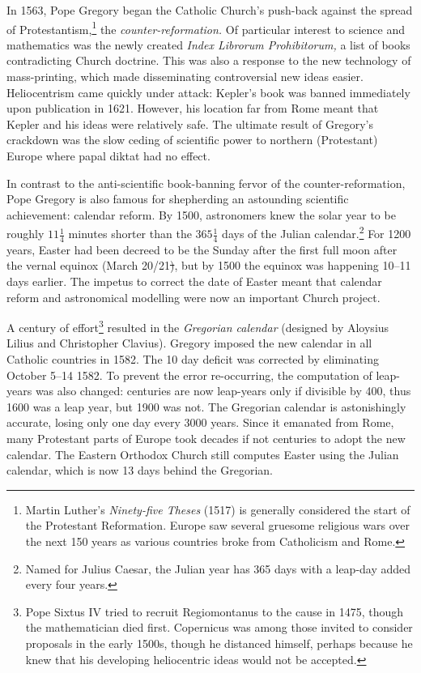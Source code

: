\goodbreak



In 1563, Pope Gregory began the Catholic Church's push-back against the spread of Protestantism,\footnote{Martin Luther's \emph{Ninety-five Theses} (1517) is generally considered the start of the Protestant Reformation. Europe saw several gruesome religious wars over the next 150 years as various countries broke from Catholicism and Rome.} the \emph{counter-reformation.} Of particular interest to science and mathematics was the newly created \emph{Index Librorum Prohibitorum,} a list of books contradicting Church doctrine. This was also a response to the new technology of mass-printing, which made disseminating controversial new ideas easier. Heliocentrism came quickly under attack: Kepler's book was banned immediately upon publication in 1621. However, his location far from Rome meant that Kepler and his ideas were relatively safe. The ultimate result of Gregory's crackdown was the slow ceding of scientific power to northern (Protestant) Europe where papal diktat had no effect. \smallbreak

In contrast to the anti-scientific book-banning fervor of the counter-reformation, Pope Gregory is also famous for shepherding an astounding scientific achievement: calendar reform. By 1500, astronomers knew the solar year to be roughly $11\frac 14$ minutes shorter than the $365\frac 14$ days of the Julian calendar.\footnote{Named for Julius Caesar, the Julian year has 365 days with a leap-day added every four years.} For 1200 years, Easter had been decreed to be the Sunday after the first full moon after the vernal equinox (March 20\th/21\st), but by 1500 the equinox was happening 10--11 days earlier. The impetus to correct the date of Easter meant that calendar reform and astronomical modelling were now an important Church project.\smallbreak

A century of effort\footnote{Pope Sixtus IV tried to recruit Regiomontanus to the cause in 1475, though the mathematician died first. Copernicus was among those invited to consider proposals in the early 1500s, though he distanced himself, perhaps because he knew that his developing heliocentric ideas would not be accepted.} resulted in the \emph{Gregorian calendar} (designed by Aloysius Lilius and Christopher Clavius). Gregory imposed the new calendar in all Catholic countries in 1582. The 10 day deficit was corrected by eliminating October 5\th--14\th{} 1582. To prevent the error re-occurring, the computation of leap-years was also changed: centuries are now leap-years only if divisible by 400, thus 1600 was a leap year, but 1900 was not. The Gregorian calendar is astonishingly accurate, losing only one day every 3000 years. Since it emanated from Rome, many Protestant parts of Europe took decades if not centuries to adopt the new calendar. The Eastern Orthodox Church still computes Easter using the Julian calendar, which is now 13 days behind the Gregorian.


